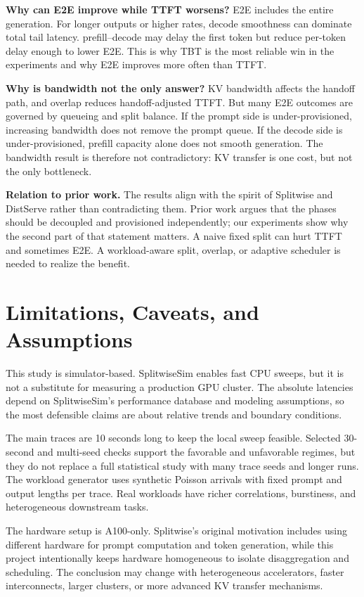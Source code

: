 \documentclass[10pt]{article}
\newcommand{\pd}{prefill--decode}
\begin{document}
\textbf{Why can E2E improve while TTFT worsens?} E2E includes the entire generation. For longer outputs or higher rates, decode smoothness can dominate total tail latency. \pd{} may delay the first token but reduce per-token delay enough to lower E2E. This is why TBT is the most reliable win in the experiments and why E2E improves more often than TTFT.

\textbf{Why is bandwidth not the only answer?} KV bandwidth affects the handoff path, and overlap reduces handoff-adjusted TTFT. But many E2E outcomes are governed by queueing and split balance. If the prompt side is under-provisioned, increasing bandwidth does not remove the prompt queue. If the decode side is under-provisioned, prefill capacity alone does not smooth generation. The bandwidth result is therefore not contradictory: KV transfer is one cost, but not the only bottleneck.

\textbf{Relation to prior work.} The results align with the spirit of Splitwise and DistServe rather than contradicting them. Prior work argues that the phases should be decoupled and provisioned independently; our experiments show why the second part of that statement matters. A naive fixed split can hurt TTFT and sometimes E2E. A workload-aware split, overlap, or adaptive scheduler is needed to realize the benefit.

\section{Limitations, Caveats, and Assumptions}
This study is simulator-based. SplitwiseSim enables fast CPU sweeps, but it is not a substitute for measuring a production GPU cluster. The absolute latencies depend on SplitwiseSim's performance database and modeling assumptions, so the most defensible claims are about relative trends and boundary conditions.

The main traces are 10 seconds long to keep the local sweep feasible. Selected 30-second and multi-seed checks support the favorable and unfavorable regimes, but they do not replace a full statistical study with many trace seeds and longer runs. The workload generator uses synthetic Poisson arrivals with fixed prompt and output lengths per trace. Real workloads have richer correlations, burstiness, and heterogeneous downstream tasks.

The hardware setup is A100-only. Splitwise's original motivation includes using different hardware for prompt computation and token generation, while this project intentionally keeps hardware homogeneous to isolate disaggregation and scheduling. The conclusion may change with heterogeneous accelerators, faster interconnects, larger clusters, or more advanced KV transfer mechanisms.
\end{document}
